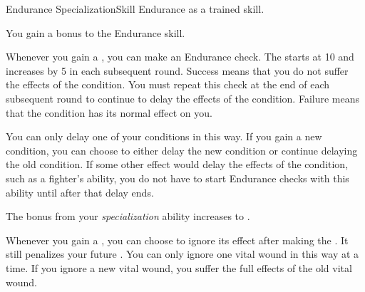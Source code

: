     \begin{feat}{Endurance Specialization}{Skill}
        \featpre Endurance as a trained skill.

         You gain a  bonus to the Endurance skill.

         Whenever you gain a , you can make an Endurance check.
        The  starts at 10 and increases by 5 in each subsequent round.
        Success means that you do not suffer the effects of the condition.
        You must repeat this check at the end of each subsequent round to continue to delay the effects of the condition.
        Failure means that the condition has its normal effect on you.

        You can only delay one of your conditions in this way.
        If you gain a new condition, you can choose to either delay the new condition or continue delaying the old condition.
        If some other effect would delay the effects of the condition, such as a fighter's  ability, you do not have to start Endurance checks with this ability until after that delay ends.

         The bonus from your \textit{specialization} ability increases to .

         Whenever you gain a , you can choose to ignore its effect after making the .
        It still penalizes your future .
        You can only ignore one vital wound in this way at a time.
        If you ignore a new vital wound, you suffer the full effects of the old vital wound.
    \end{feat}


